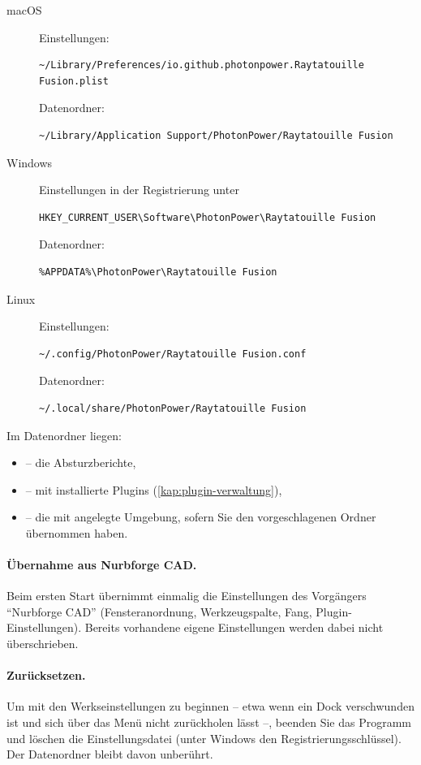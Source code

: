 \begin{description}
  \item[macOS] Einstellungen:
\begin{lstlisting}
~/Library/Preferences/io.github.photonpower.Raytatouille Fusion.plist
\end{lstlisting}
    Datenordner:
\begin{lstlisting}
~/Library/Application Support/PhotonPower/Raytatouille Fusion
\end{lstlisting}
  \item[Windows] Einstellungen in der Registrierung unter
\begin{lstlisting}
HKEY_CURRENT_USER\Software\PhotonPower\Raytatouille Fusion
\end{lstlisting}
    Datenordner:
\begin{lstlisting}
%APPDATA%\PhotonPower\Raytatouille Fusion
\end{lstlisting}
  \item[Linux] Einstellungen:
\begin{lstlisting}
~/.config/PhotonPower/Raytatouille Fusion.conf
\end{lstlisting}
    Datenordner:
\begin{lstlisting}
~/.local/share/PhotonPower/Raytatouille Fusion
\end{lstlisting}
\end{description}

Im Datenordner liegen:
\begin{itemize}
  \item {} -- die Absturzberichte,
  \item {} -- mit  installierte Plugins
    (\autoref{kap:plugin-verwaltung}),
  \item {} -- die mit  angelegte Umgebung, sofern
    Sie den vorgeschlagenen Ordner übernommen haben.
\end{itemize}

\paragraph{Übernahme aus Nurbforge CAD.} Beim ersten Start übernimmt \produkt{} einmalig die
Einstellungen des Vorgängers \enquote{Nurbforge CAD} (Fensteranordnung, Werkzeugspalte, Fang,
Plugin-Einstellungen). Bereits vorhandene eigene Einstellungen werden dabei nicht
überschrieben.

\paragraph{Zurücksetzen.} Um mit den Werkseinstellungen zu beginnen -- etwa wenn ein Dock
verschwunden ist und sich über das Menü  nicht zurückholen lässt --, beenden Sie
das Programm und löschen die Einstellungsdatei (unter Windows den Registrierungsschlüssel).
Der Datenordner bleibt davon unberührt.

